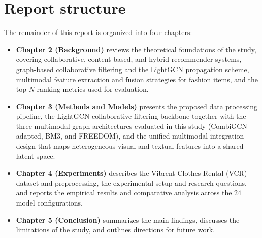 \section{Report structure}

The remainder of this report is organized into four chapters:

\begin{itemize}
    \item \textbf{Chapter 2 (Background)} reviews the theoretical foundations of the study, covering collaborative, content-based, and hybrid recommender systems, graph-based collaborative filtering and the LightGCN propagation scheme, multimodal feature extraction and fusion strategies for fashion items, and the top-$N$ ranking metrics used for evaluation.
    \item \textbf{Chapter 3 (Methods and Models)} presents the proposed data processing pipeline, the LightGCN collaborative-filtering backbone together with the three multimodal graph architectures evaluated in this study (CombiGCN adapted, BM3, and FREEDOM), and the unified multimodal integration design that maps heterogeneous visual and textual features into a shared latent space.
    \item \textbf{Chapter 4 (Experiments)} describes the Vibrent Clothes Rental (VCR) dataset and preprocessing, the experimental setup and research questions, and reports the empirical results and comparative analysis across the $24$ model configurations.
    \item \textbf{Chapter 5 (Conclusion)} summarizes the main findings, discusses the limitations of the study, and outlines directions for future work.
\end{itemize}
